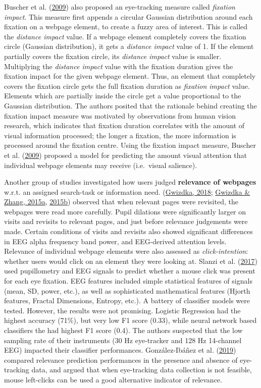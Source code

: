 \documentclass[letterpaper, nobind]{templates/ociamthesis}
\begin{document}
Buscher et al. (\protect\hyperlink{ref-110}{2009}) also proposed an eye-tracking measure called \emph{fixation impact}.
This measure first appends a circular Gaussian distribution around each
fixation on a webpage element, to create a fuzzy area of interest. This
is called the \emph{distance impact} value. If a webpage element completely
covers the fixation circle (Gaussian distribution), it gets a \emph{distance
impact} value of 1. If the element partially covers the fixation circle,
its \emph{distance impact} value is smaller. Multiplying the \emph{distance
impact} value with the fixation duration gives the fixation impact for
the given webpage element. Thus, an element that completely covers the
fixation circle gets the full fixation duration as \emph{fixation impact}
value. Elements which are partially inside the circle get a value
proportional to the Gaussian distribution. The authors posited that the
rationale behind creating the fixation impact measure was motivated by
observations from human vision research, which indicates that fixation
duration correlates with the amount of visual information processed; the
longer a fixation, the more information is processed around the fixation
centre. Using the fixation impact measure, Buscher et al. (\protect\hyperlink{ref-110}{2009}) proposed a model for
predicting the amount visual attention that individual webpage elements
may receive (i.e.~visual salience).

Another group of studies investigated how users judged \textbf{relevance of
webpages} w.r.t. an assigned search-task or information need.
(\protect\hyperlink{ref-74}{Gwizdka, 2018}; \protect\hyperlink{ref-47}{Gwizdka \& Zhang, 2015a}, \protect\hyperlink{ref-48}{2015b}) observed that when relevant pages were revisited, the
webpages were read more carefully. Pupil dilations were significantly
larger on visits and revisits to relevant pages, and just before
relevance judgements were made. Certain conditions of visits and
revisits also showed significant differences in EEG alpha frequency band
power, and EEG-derived attention levels. Relevance of individual webpage
elements were also assessed as \emph{click-intention}: whether users would
click on an element they were looking at. Slanzi et al. (\protect\hyperlink{ref-69}{2017}) used pupillometry and EEG
signals to predict whether a mouse click was present for each eye
fixation. EEG features included simple statistical features of signals
(mean, SD, power, etc.), as well as sophisticated mathematical features
(Hjorth features, Fractal Dimensions, Entropy, etc.). A battery of
classifier models were tested. However, the results were not promising.
Logistic Regression had the highest accuracy (71\%), but very low F1
score (0.33), while neural network based classifiers the had highest F1
score (0.4). The authors suspected that the low sampling rate of their
instruments (30 Hz eye-tracker and 128 Hz 14-channel EEG) impacted their
classifier performances. González-Ibáñez et al. (\protect\hyperlink{ref-81}{2019}) compared relevance prediction performances
in the presence and absence of eye-tracking data, and argued that when
eye-tracking data collection is not feasible, mouse left-clicks can be
used a good alternative indicator of relevance.
\end{document}
